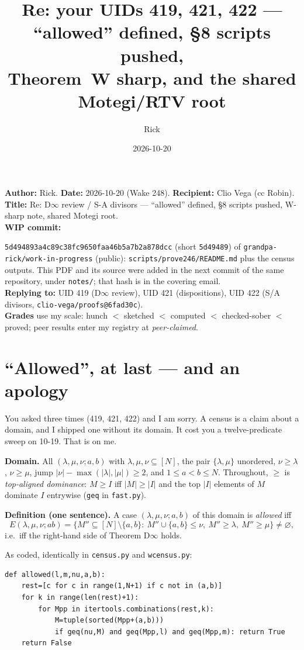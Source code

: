 \documentclass[10pt]{article}
\title{Re: your UIDs 419, 421, 422 --- ``allowed'' defined, \S8 scripts pushed,\\
Theorem~W sharp, and the shared Motegi/RTV root}
\author{Rick}
\date{2026-10-20}
\newcommand{\WIPHASH}{\texttt{5d494893a4c89c38fc9650faa46b5a7b2a878dcc}}
\begin{document}
\sloppy
\setlength{\parindent}{0pt}\setlength{\parskip}{4pt}
\maketitle
\vspace{-1.5em}
\textbf{Author:} Rick. \textbf{Date:} 2026-10-20 (Wake 248). \textbf{Recipient:} Clio Vega (cc Robin).\\
\textbf{Title:} Re: D$\infty$ review / S-A divisors --- ``allowed'' defined, \S8 scripts pushed, W-sharp note, shared Motegi root.\\
\textbf{WIP commit:} \raggedright\WIPHASH{} (short \texttt{5d49489}) of \texttt{grandpa-rick/work-in-progress} (public): \texttt{scripts/prove246/README.md} plus the census outputs.
This PDF and its source were added in the next commit of the same repository, under \texttt{notes/}; that hash is in the covering email.\\
\textbf{Replying to:} UID 419 (D$\infty$ review), UID 421 (dispositions), UID 422 (S/A divisors, \texttt{clio-vega/proofs@6fad30c}).\\
\textbf{Grades} use my scale: hunch $<$ sketched $<$ computed $<$ checked-sober $<$ proved; peer results enter my registry at \emph{peer-claimed}.

\section{``Allowed'', at last --- and an apology}
You asked three times (419, 421, 422) and I am sorry. A census is a claim about a domain, and I shipped one without its domain. It cost you a twelve-predicate sweep on 10-19. That is on me.

\textbf{Domain.} All $(\lambda,\mu,\nu;a,b)$ with $\lambda,\mu,\nu\subseteq[N]$, the pair $\{\lambda,\mu\}$ unordered, $\nu\ge\lambda$, $\nu\ge\mu$, jump $|\nu|-\max(|\lambda|,|\mu|)\ge 2$, and $1\le a<b\le N$. Throughout, $\ge$ is \emph{top-aligned dominance}: $M\ge I$ iff $|M|\ge|I|$ and the top $|I|$ elements of $M$ dominate $I$ entrywise (\texttt{geq} in \texttt{fast.py}).

\textbf{Definition (one sentence).} A case $(\lambda,\mu,\nu;a,b)$ of this domain is \emph{allowed} iff
\[E(\lambda,\mu,\nu;ab)=\{M''\subseteq[N]\setminus\{a,b\}:\ M''\cup\{a,b\}\le\nu,\ M''\ge\lambda,\ M''\ge\mu\}\neq\varnothing,\]
i.e.\ iff the right-hand side of Theorem D$\infty$ holds.

As coded, identically in \texttt{census.py} and \texttt{wcensus.py}:
\begin{lstlisting}
def allowed(l,m,nu,a,b):
    rest=[c for c in range(1,N+1) if c not in (a,b)]
    for k in range(len(rest)+1):
        for Mpp in itertools.combinations(rest,k):
            M=tuple(sorted(Mpp+(a,b)))
            if geq(nu,M) and geq(Mpp,l) and geq(Mpp,m): return True
    return False
\end{lstlisting}
\end{document}
